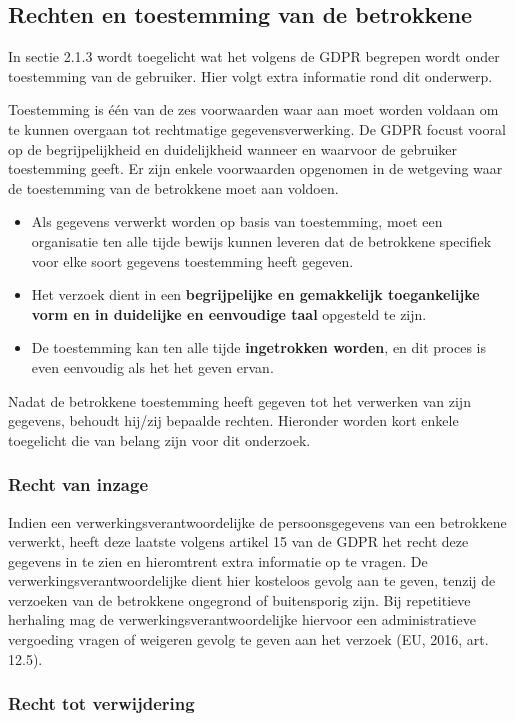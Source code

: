 \subsection{Rechten en toestemming van de betrokkene}
In sectie 2.1.3 wordt toegelicht wat het volgens de GDPR begrepen wordt onder toestemming van de gebruiker. Hier volgt extra informatie rond dit onderwerp. 

 Toestemming is één van de zes voorwaarden waar aan moet worden voldaan om te kunnen overgaan tot rechtmatige gegevensverwerking. De GDPR focust vooral op de begrijpelijkheid en duidelijkheid wanneer en waarvoor de gebruiker toestemming geeft. 
Er zijn enkele voorwaarden opgenomen in de wetgeving waar de toestemming van de betrokkene moet aan voldoen. 
\begin{itemize}
	\item  Als  gegevens verwerkt worden op basis van toestemming, moet een organisatie ten alle tijde bewijs kunnen leveren dat de betrokkene specifiek voor elke soort gegevens toestemming heeft gegeven. 
	\item  Het verzoek dient in een \textbf{begrijpelijke en gemakkelijk toegankelijke vorm en in duidelijke en eenvoudige taal} opgesteld te zijn. 
	\item  
	De toestemming kan ten alle tijde \textbf{ingetrokken worden}, en dit proces is even eenvoudig als het het geven ervan. 
\end{itemize}

Nadat de betrokkene toestemming heeft gegeven tot het verwerken van zijn gegevens, behoudt hij/zij bepaalde rechten. Hieronder worden kort enkele toegelicht die van belang zijn voor dit onderzoek. 

\subsubsection{Recht van inzage}
Indien een verwerkingsverantwoordelijke de persoonsgegevens van een betrokkene verwerkt, heeft deze laatste volgens artikel 15 van de GDPR het recht deze gegevens in te
zien en hieromtrent extra informatie op te vragen.
De verwerkingsverantwoordelijke dient hier kosteloos gevolg aan te geven, tenzij de
verzoeken van de betrokkene ongegrond of buitensporig zijn. Bij repetitieve herhaling
mag de verwerkingsverantwoordelijke hiervoor een administratieve vergoeding vragen of
weigeren gevolg te geven aan het verzoek (EU, 2016, art. 12.5).

\subsubsection{Recht tot verwijdering}

